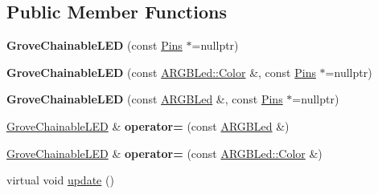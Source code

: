 \subsection*{Public Member Functions}
\begin{DoxyCompactItemize}
\item 
\mbox{\label{classathome_1_1display_1_1_grove_chainable_l_e_d_af1ac9461a4d15ec2b9c18fbaab669ad4}} 
{\bfseries Grove\+Chainable\+L\+ED} (const \mbox{\hyperlink{structathome_1_1display_1_1_grove_chainable_l_e_d_1_1_pins}{Pins}} $\ast$=nullptr)
\item 
\mbox{\label{classathome_1_1display_1_1_grove_chainable_l_e_d_abe0361700f530eef79a1d9156de42da7}} 
{\bfseries Grove\+Chainable\+L\+ED} (const \mbox{\hyperlink{structathome_1_1display_1_1_a_r_g_b_led_1_1_color}{A\+R\+G\+B\+Led\+::\+Color}} \&, const \mbox{\hyperlink{structathome_1_1display_1_1_grove_chainable_l_e_d_1_1_pins}{Pins}} $\ast$=nullptr)
\item 
\mbox{\label{classathome_1_1display_1_1_grove_chainable_l_e_d_ae686988d0387af5bfe5f826219579f67}} 
{\bfseries Grove\+Chainable\+L\+ED} (const \mbox{\hyperlink{classathome_1_1display_1_1_a_r_g_b_led}{A\+R\+G\+B\+Led}} \&, const \mbox{\hyperlink{structathome_1_1display_1_1_grove_chainable_l_e_d_1_1_pins}{Pins}} $\ast$=nullptr)
\item 
\mbox{\label{classathome_1_1display_1_1_grove_chainable_l_e_d_a893e087b123d35cef059b8aaa4ddba28}} 
\mbox{\hyperlink{classathome_1_1display_1_1_grove_chainable_l_e_d}{Grove\+Chainable\+L\+ED}} \& {\bfseries operator=} (const \mbox{\hyperlink{classathome_1_1display_1_1_a_r_g_b_led}{A\+R\+G\+B\+Led}} \&)
\item 
\mbox{\label{classathome_1_1display_1_1_grove_chainable_l_e_d_a51ed72988d4313ab87e6ad492fc0c65a}} 
\mbox{\hyperlink{classathome_1_1display_1_1_grove_chainable_l_e_d}{Grove\+Chainable\+L\+ED}} \& {\bfseries operator=} (const \mbox{\hyperlink{structathome_1_1display_1_1_a_r_g_b_led_1_1_color}{A\+R\+G\+B\+Led\+::\+Color}} \&)
\item 
virtual void \mbox{\hyperlink{classathome_1_1display_1_1_grove_chainable_l_e_d_a05a4a1381396b7fc11a24993865d8226}{update}} ()
\end{DoxyCompactItemize}

